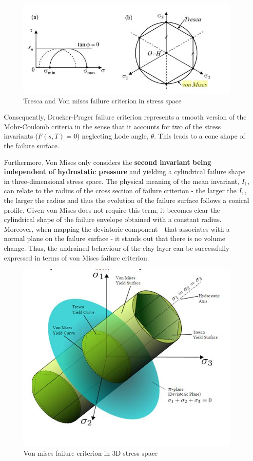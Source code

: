 \documentclass[12pt,a4paper]{report}
\begin{document}
\begin{figure}[h!]
	\centering
	\includegraphics[width=0.8\linewidth]{"tresca"}
	\caption{Tresca and Von mises failure criterion in stress space}
	\label{tresca}
\end{figure}

Consequently, Drucker-Prager failure criterion represents a smooth version of the Mohr-Coulomb criteria in the sense that it accounts for two of the stress invariants ($F (s, T) = 0$) neglecting Lode angle, $\theta$. This leads to a cone shape of the failure surface. 

Furthermore, Von Mises only considers the \textbf{second invariant being independent of hydrostatic pressure }and yielding a cylindrical failure shape in three-dimensional stress space. The physical meaning of the mean invariant, $I_1$, can relate to the radius of the cross section of failure criterion - the larger the $I_1$, the larger the radius and thus the evolution of the failure surface follows a conical profile. Given von Mises does not require this term,  it becomes clear the cylindrical shape of the failure envelope obtained with a constant radius. Moreover, when mapping the deviatoric component - that associates with a normal plane on the failure surface - it stands out that there is no volume change. Thus, the undrained behaviour of the clay layer can be successfully expressed in terms of von Mises failure criterion. 

\begin{figure}[h!]
	\centering
	\includegraphics[width=0.8\linewidth]{"Mises"}
	\caption{Von mises failure criterion in 3D stress space}
	\label{Mises}
\end{figure}
\end{document}

